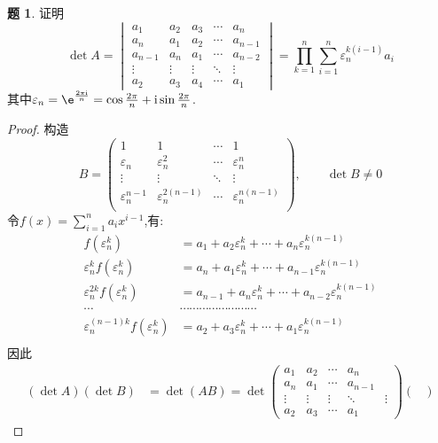 \documentclass{article}
\renewcommand{\i}{\mathrm{i}}
\theoremstyle{definition}
\newtheorem{exercise}{题}[section]
\begin{document}
\begin{exercise}
    证明$$\det A=\begin{vmatrix}
        a_1&a_2&a_3&\cdots&a_n\\
        a_n&a_1&a_2&\cdots&a_{n-1}\\
        a_{n-1}&a_n&a_1&\cdots&a_{n-2}\\
        \vdots&\vdots&\vdots&\ddots&\vdots\\
        a_2&a_3&a_4&\cdots&a_1
    \end{vmatrix}=\prod_{k=1}^{n}\sum_{i=1}^{n}\varepsilon_{n}^{k(i-1)}a_i$$
    其中$\varepsilon_n=\e^{\frac{2\pi\i}{n}}=\cos \frac{2\pi}{n}+\i\sin\frac{2\pi}{n}$.
\end{exercise}
\begin{proof}
    构造$$B=\begin{pmatrix}
        1&1&\cdots&1\\
        \varepsilon_n&\varepsilon_n^2&\cdots&\varepsilon_n^n\\
        \vdots&\vdots&\ddots&\vdots\\
        \varepsilon_n^{n-1}&\varepsilon_n^{2(n-1)}&\cdots&\varepsilon_n^{n(n-1)}\\
    \end{pmatrix},\qquad \det B\neq 0$$
    令$f(x)=\sum_{i=1}^n a_ix^{i-1}$,有:$$\begin{aligned}
        f(\varepsilon_n^k)&=a_1+a_2\varepsilon_n^k+\cdots+a_n\varepsilon_n^{k(n-1)}\\
        \varepsilon_n^{k} f(\varepsilon_n^k)&=a_n+a_1\varepsilon_n^k+\cdots+a_{n-1}\varepsilon_n^{k(n-1)}\\
        \varepsilon_n^{2k} f(\varepsilon_n^k)&=a_{n-1}+a_n\varepsilon_n^k+\cdots+a_{n-2}\varepsilon_n^{k(n-1)}\\
        \cdots&\cdots\cdots\cdots\cdots\cdots\cdots\cdots\cdots\\
        \varepsilon_n^{(n-1)k} f(\varepsilon_n^k)&=a_2+a_3\varepsilon_n^k+\cdots+a_1\varepsilon_n^{k(n-1)}\\
    \end{aligned}$$
    因此$$\begin{aligned}
        (\det A)(\det B)&=\det(AB)=\det \begin{pmatrix}
        a_1&a_2&\cdots&a_n\\
        a_n&a_1&\cdots&a_{n-1}\\
        \vdots&\vdots&\vdots&\ddots&\vdots\\
        a_2&a_3&\cdots&a_1
    \end{pmatrix}\begin{pmatrix}

\end{pmatrix}
\end{aligned}$$
\end{proof}
\end{document}
